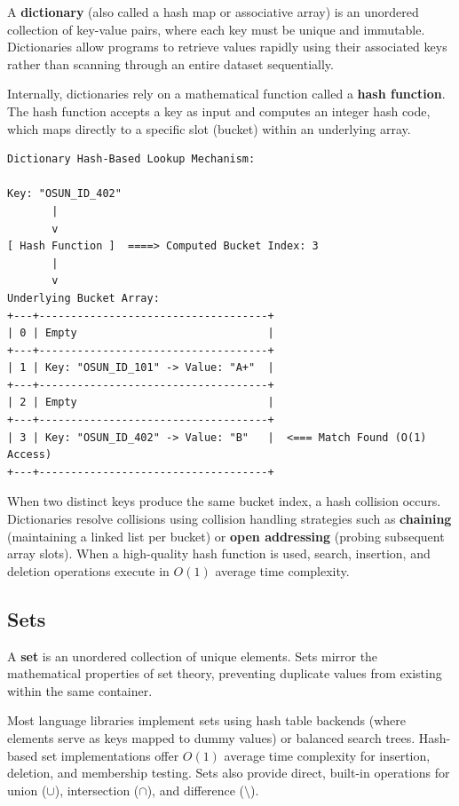 \documentclass[12pt]{report}
\begin{document}
A \textbf{dictionary} (also called a hash map or associative array) is an unordered collection of key-value pairs, where each key must be unique and immutable. Dictionaries allow programs to retrieve values rapidly using their associated keys rather than scanning through an entire dataset sequentially.

Internally, dictionaries rely on a mathematical function called a \textbf{hash function}. The hash function accepts a key as input and computes an integer hash code, which maps directly to a specific slot (bucket) within an underlying array.

\begin{verbatim}
Dictionary Hash-Based Lookup Mechanism:

Key: "OSUN_ID_402"
       |
       v
[ Hash Function ]  ====> Computed Bucket Index: 3
       |
       v
Underlying Bucket Array:
+---+------------------------------------+
| 0 | Empty                              |
+---+------------------------------------+
| 1 | Key: "OSUN_ID_101" -> Value: "A+"  |
+---+------------------------------------+
| 2 | Empty                              |
+---+------------------------------------+
| 3 | Key: "OSUN_ID_402" -> Value: "B"   |  <=== Match Found (O(1) Access)
+---+------------------------------------+
\end{verbatim}

When two distinct keys produce the same bucket index, a hash collision occurs. Dictionaries resolve collisions using collision handling strategies such as \textbf{chaining} (maintaining a linked list per bucket) or \textbf{open addressing} (probing subsequent array slots). When a high-quality hash function is used, search, insertion, and deletion operations execute in $O(1)$ average time complexity.

\subsection{Sets}

A \textbf{set} is an unordered collection of unique elements. Sets mirror the mathematical properties of set theory, preventing duplicate values from existing within the same container.

Most language libraries implement sets using hash table backends (where elements serve as keys mapped to dummy values) or balanced search trees. Hash-based set implementations offer $O(1)$ average time complexity for insertion, deletion, and membership testing. Sets also provide direct, built-in operations for union ($\cup$), intersection ($\cap$), and difference ($\setminus$).
\end{document}

